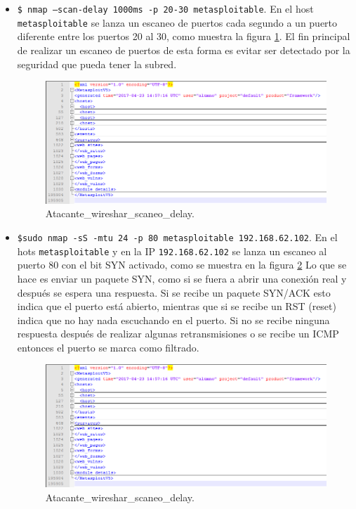 \documentclass[a4,12pt,onecolum]{article}
\begin{document}
\begin{itemize}
  \item \texttt{\$ nmap —scan-delay 1000ms -p 20-30 metasploitable}. En el host \texttt{metasploitable} se lanza un escaneo de puertos cada segundo a un puerto diferente entre los puertos 20 al 30, como muestra la figura \ref{fig:nmap5}. El fin principal de realizar un escaneo de puertos de esta forma es evitar ser detectado por la seguridad que pueda tener la subred.

  \begin{figure}[htbp]
  \centering
  \includegraphics[width=1.0\textwidth]{./images/Atacante_scaner_y_BBDD.png}
  \caption{Atacante\_wireshar\_scaneo\_delay.}
  \label{fig:nmap5}
  \end{figure}

  \item \texttt{\$sudo nmap -sS -mtu 24 -p 80 metasploitable 192.168.62.102}. En el hots \texttt{metasploitable} y en la IP \texttt{192.168.62.102} se lanza un escaneo al puerto 80 con el bit SYN activado, como se muestra en la figura \ref{fig:nmap6} Lo que se hace es enviar un paquete SYN, como si se fuera a abrir una conexión real y después se espera una respuesta. Si se recibe un paquete SYN/ACK esto indica que el puerto está abierto, mientras que si se recibe un RST (reset) indica que no hay nada escuchando en el puerto. Si no se recibe ninguna respuesta después de realizar algunas retransmisiones o se recibe un ICMP entonces el puerto se marca como filtrado.

  \begin{figure}[htbp]
  \centering
  \includegraphics[width=1.0\textwidth]{./images/Atacante_scaner_y_BBDD.png}
  \caption{Atacante\_wireshar\_scaneo\_delay.}
  \label{fig:nmap6}
  \end{figure}
\end{itemize}
\end{document}
